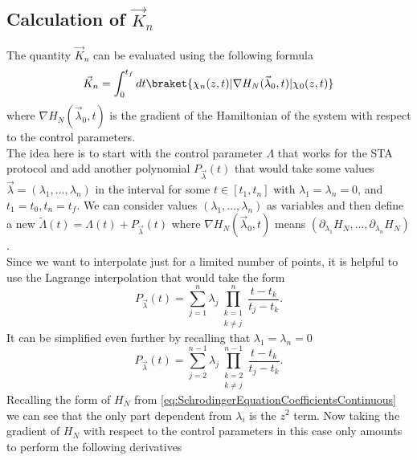 \subsection{Calculation of $ \vec{ K }_{n} $ }
The quantity $ \vec{ K }_{n} $ can be evaluated using the following formula
\begin{equation}
	\label{eq:Kns}
	\vec{K}_{n} =  \int_{0}^{t_{f}} dt \braket{\chi_{n}(z,t)| \nabla H_{N}(\vec{ \lambda }_{0}, t)|\chi_{0}(z,t)}
\end{equation}
where $ \nabla H_{N}(\vec{ \lambda }_{0}, t)$ is the gradient of the Hamiltonian of the system with respect to the control parameters.\\
The idea here is to start with the control parameter $ \Lambda $ that works for the STA protocol and add another polynomial $ P_{\vec{\lambda}}(t) $ that would take some values $ \vec{\lambda}  = (\lambda_{1},..., \lambda_{n})$ in the interval for some $ t \in [t_1, t_{n}] $ with $ \lambda_{1} = \lambda_{n} = 0 $, and $ t_{1}  = t_0 , t_{n} = t_{f} $.
We can consider values $ (\lambda_{1},..., \lambda_n) $ as variables and then define a new $ \tilde{\Lambda}(t) = \Lambda(t) +   P_{\vec{\lambda}}(t) $ where $ \nabla H_{N}(\vec{\lambda}_0,t) $ means $ (\partial_\lambda_1 H_{N},..., \partial_\lambda_{n} H_{N}) $   .\\
Since we want to interpolate just for a limited number of points, it is helpful to use the Lagrange interpolation that would take the form
\begin{equation}
	\label{eq:LagrangeInterpolationPolynomial}
	P_{\vec{ \lambda }}(t) = \sum_{j=1}^{n}\lambda_{j}\prod_{\substack{k=1\\k\neq j }}^{n}\frac{t-t_{k}}{t_{j} - t_{k}}.
\end{equation}
It can be simplified even further by recalling that $ \lambda_{1} = \lambda_{n} = 0 $
\begin{equation}
	\label{eq:LagrangeInterpolationPolynomialSimplified}
	P_{\vec{ \lambda }}(t) = \sum_{j=2}^{n-1}\lambda_{j}\prod_{\substack{k=2\\k\neq j }}^{n-1}\frac{t-t_{k}}{t_{j} - t_{k}}.
\end{equation}
Recalling the form of $   H_{N} $ from \cref{eq:SchrodingerEquationCoefficientsContinuous} we can see that the only part dependent from $ \lambda_{i} $ is the $ z^2 $ term.
Now taking the gradient of $ H_{N} $ with respect to the control parameters in this case only amounts to perform the following derivatives
